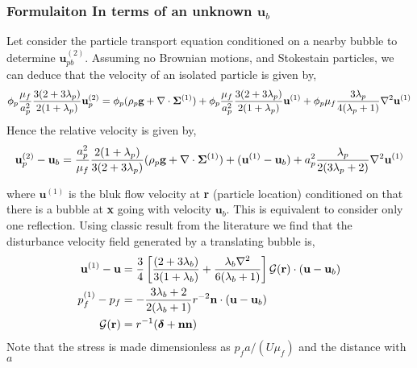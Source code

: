 \documentclass[12pt]{My_preprint}
\begin{document}
\subsubsection{Formulaiton In terms of an unknown $\textbf{u}_b$}
Let consider the particle transport equation conditioned on a nearby bubble to determine $\textbf{u}_{pb}^{(2)}$. 
Assuming no Brownian motions, and Stokestain  particles, we can deduce that the velocity of an isolated particle is given by, 
\begin{equation}
    \phi_p
    \frac{\mu_f}{a_p^2}
    \frac{3(2+3\lambda_p)}{2(1+\lambda_p)}\textbf{u}_p^{(2)}
    =
    \phi_p( \rho_p\textbf{g}+ \mathbf{\nabla}\cdot\bm\Sigma^{(1)} )
    +
    \phi_p\frac{\mu_f}{a_p^2}
    \frac{3(2+3\lambda_p)}{2(1+\lambda_p)}\textbf{u}^{(1)} 
    + \phi_p\mu_f  \frac{3\lambda_p}{4(\lambda_p +1)} \mathbf{\nabla}^2 \textbf{u}^{(1)}
\end{equation}
Hence the relative velocity is given by, 
\begin{equation}
    \textbf{u}_p^{(2)} - \textbf{u}_b
    =
    \frac{a_p^2}{\mu_f}
    \frac{2(1+\lambda_p)}{3(2+3\lambda_p)}( \rho_p\textbf{g}+ \mathbf{\nabla}\cdot\bm\Sigma^{(1)} )
    + (\textbf{u}^{(1)} - \textbf{u}_b)
    + a_p^2 \frac{\lambda_p}{2(3\lambda_p +2)} \mathbf{\nabla}^2 \textbf{u}^{(1)}
\end{equation}

where $\textbf{u}^{(1)}$ is the bluk flow velocity at \textbf{r} (particle location) conditioned on that there is a bubble at \textbf{x} going with velocity $\textbf{u}_b$. 
This is equivalent to consider only one reflection. 
Using classic result from the literature we find that the disturbance velocity field generated by a translating bubble is, 
\begin{align*}
    \textbf{u}^{(1)} - \textbf{u}
    &=
    \frac{3}{4}\left[
        \frac{(2+3\lambda_b)}{3(1+\lambda_b)}
        + 
        \frac{\lambda_b\mathbf{\nabla}^2}{6(\lambda_b+1)}
        \right]\mathcal{G}(\textbf{r})\cdot
    (\textbf{u}- \textbf{u}_b)\\
    p_f^{(1)} - p_f
    &=
    -\frac{3\lambda_b+2}{2(\lambda_b+1)}r^{-2} \textbf{n}\cdot (\textbf{u}- \textbf{u}_b)\\
    \mathcal{G}(\textbf{r})
    &=
    r^{-1}(\bm\delta + \textbf{nn})
\end{align*}
Note that the stress is made dimensionless as $p_f  a / (U \mu_f)$ and the distance with $a$
\end{document}
